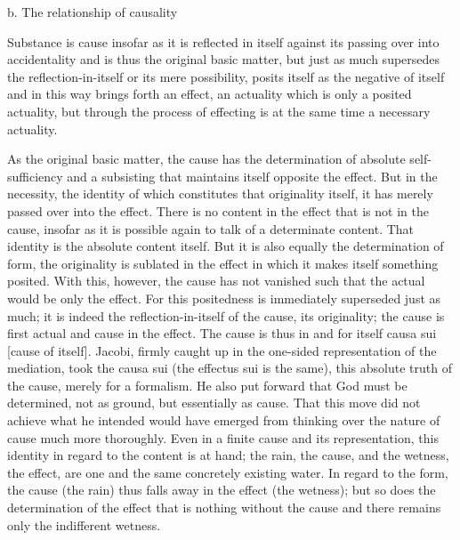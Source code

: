 b. The relationship of causality

Substance is cause insofar as it is reflected in itself
against its passing over into accidentality and
is thus the original basic matter,
but just as much supersedes the reflection-in-itself
or its mere possibility,
posits itself as the negative of itself and
in this way brings forth an effect,
an actuality which is only a posited actuality,
but through the process of effecting is
at the same time a necessary actuality.

    As the original basic matter, the cause has
    the determination of absolute self-sufficiency and
    a subsisting that maintains itself opposite the effect.
    But in the necessity, the identity of which
    constitutes that originality itself,
    it has merely passed over into the effect.
    There is no content in the effect that is not in the cause,
    insofar as it is possible again to talk of a determinate content.
    That identity is the absolute content itself.
    But it is also equally the determination of form,
    the originality is sublated in the effect in which
    it makes itself something posited.
    With this, however, the cause has not vanished such that
    the actual would be only the effect.
    For this positedness is immediately superseded just as much;
    it is indeed the reflection-in-itself of the cause, its originality;
    the cause is first actual and cause in the effect.
    The cause is thus in and for itself causa sui [cause of itself].
    Jacobi, firmly caught up in the one-sided
    representation of the mediation, took the causa sui (the effectus sui is
    the same), this absolute truth of the cause, merely for a formalism.
    He also put forward that God must be determined, not as ground,
    but essentially as cause.
    That this move did not achieve what he
    intended would have emerged from thinking over the nature of
    cause much more thoroughly.
    Even in a finite cause and its representation,
    this identity in regard to the content is at hand;
    the rain, the cause, and the wetness, the effect, are one and the same
    concretely existing water.
    In regard to the form, the cause (the rain) thus
    falls away in the effect (the wetness);
    but so does the determination of the effect
    that is nothing without the cause and
    there remains only the indifferent wetness.

